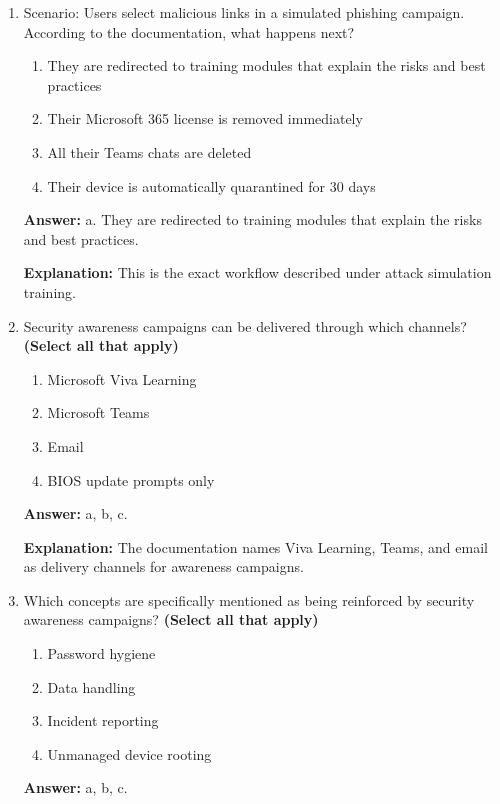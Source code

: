 \documentclass[10pt]{article}
\begin{document}
\begin{enumerate}[leftmargin=*]
\textbf{Explanation:} The documentation says these simulations mimic real-world attacks like credential harvesting or business email compromise.

\item Scenario: Users select malicious links in a simulated phishing campaign. According to the documentation, what happens next?
\begin{enumerate}[label=\alph*., leftmargin=1.5em]
\item They are redirected to training modules that explain the risks and best practices
\item Their Microsoft 365 license is removed immediately
\item All their Teams chats are deleted
\item Their device is automatically quarantined for 30 days
\end{enumerate}
\textbf{Answer:} a. They are redirected to training modules that explain the risks and best practices.

\textbf{Explanation:} This is the exact workflow described under attack simulation training.

\item Security awareness campaigns can be delivered through which channels? \textbf{(Select all that apply)}
\begin{enumerate}[label=\alph*., leftmargin=1.5em]
\item Microsoft Viva Learning
\item Microsoft Teams
\item Email
\item BIOS update prompts only
\end{enumerate}
\textbf{Answer:} a, b, c.

\textbf{Explanation:} The documentation names Viva Learning, Teams, and email as delivery channels for awareness campaigns.

\item Which concepts are specifically mentioned as being reinforced by security awareness campaigns? \textbf{(Select all that apply)}
\begin{enumerate}[label=\alph*., leftmargin=1.5em]
\item Password hygiene
\item Data handling
\item Incident reporting
\item Unmanaged device rooting
\end{enumerate}
\textbf{Answer:} a, b, c.


\end{enumerate}
\end{document}
